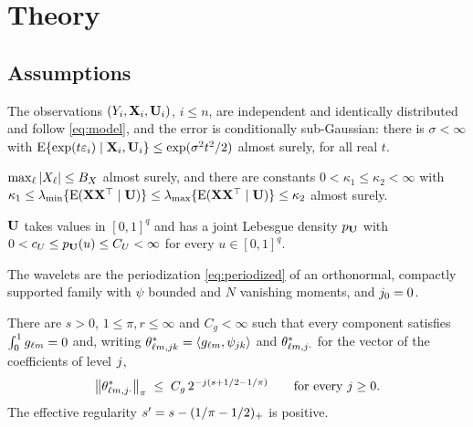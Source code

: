 \section{Theory}
\label{sec:theory}

\subsection{Assumptions}
\label{sec:assumptions}

\begin{assumption}
\label{ass:sample}
The observations $(Y_i,\mathbf{X}_i,\mathbf{U}_i)$, $i \le n$, are independent and
identically distributed and follow \eqref{eq:model}, and the error is
conditionally sub-Gaussian: there is $\sigma < \infty$ with
$\mathrm{E}\{\exp(t\varepsilon_i) \mid \mathbf{X}_i,\mathbf{U}_i\} \le \exp(\sigma^2t^2/2)$ almost
surely, for all real $t$.
\end{assumption}

\begin{assumption}
\label{ass:X}
$\max_{\ell}|X_{\ell}| \le B_X$ almost surely, and there are constants
$0 < \kappa_1 \le \kappa_2 < \infty$ with
$\kappa_1 \le \lambda_{\min}\{\mathrm{E}(\mathbf{X}\mathbf{X}^{\top}\mid\mathbf{U})\} \le
\lambda_{\max}\{\mathrm{E}(\mathbf{X}\mathbf{X}^{\top}\mid\mathbf{U})\} \le \kappa_2$ almost surely.
\end{assumption}

\begin{assumption}
\label{ass:U}
$\mathbf{U}$ takes values in $[0,1]^q$ and has a joint Lebesgue density $p_{\mathbf{U}}$
with $0 < c_U \le p_{\mathbf{U}}(u) \le C_U < \infty$ for every $u \in [0,1]^q$.
\end{assumption}

\begin{assumption}[Basis]
\label{ass:basis}
The wavelets are the periodization \eqref{eq:periodized} of an orthonormal,
compactly supported family with $\psi$ bounded and $N$ vanishing moments, and
$j_{0} = 0$.
\end{assumption}

\begin{assumption}
\label{ass:besov}
There are $s > 0$, $1 \le \pi, r \le \infty$ and $C_g < \infty$ such that
every component satisfies $\int_0^1 g_{\ell m} = 0$ and, writing
$\theta^{*}_{\ell m,jk} = \langle g_{\ell m}, \psi_{jk} \rangle$
and $\theta^{*}_{\ell m,j\cdot}$ for the vector of the coefficients of
level $j$,
\[
  \left\lVert \theta^{*}_{\ell m,j\cdot} \right\rVert_{\pi} \;\le\;
  C_g\,2^{-j(s + 1/2 - 1/\pi)} \qquad \text{for every } j \ge 0 .
\]
The effective regularity $s' = s - (1/\pi - 1/2)_{+}$ is positive.
\end{assumption}

